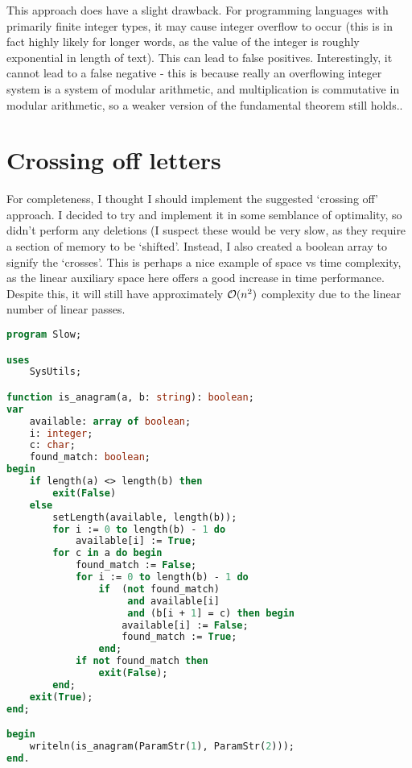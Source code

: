 \documentclass[fleqn,a4paper,11pt]{article}
\begin{document}
    This approach does have a slight drawback. For programming languages with
    primarily finite integer types, it may cause integer overflow to occur (this
    is in fact highly likely for longer words, as the value of the integer is
    roughly exponential in length of text). This can lead to false positives.
    Interestingly, it cannot lead to a false negative - this is because really
    an overflowing integer system is a system of modular arithmetic, and
    multiplication is commutative in modular arithmetic, so a weaker version of
    the fundamental theorem still holds..

    \section{Crossing off letters}

    For completeness, I thought I should implement the suggested `crossing off'
    approach. I decided to try and implement it in some semblance of optimality,
    so didn't perform any deletions (I suspect these would be very slow, as they
    require a section of memory to be `shifted'. Instead, I also created a
    boolean array to signify the `crosses'. This is perhaps a nice example of
    space vs time complexity, as the linear auxiliary space here offers a good
    increase in time performance. Despite this, it will still have approximately
    \(\operatorname{\mathcal O}(n^2)\) complexity due to the linear number of linear passes.

\begin{lstlisting}[language=Pascal, caption=`Crossing off' approach]
program Slow;

uses
    SysUtils;

function is_anagram(a, b: string): boolean;
var
    available: array of boolean;
    i: integer;
    c: char;
    found_match: boolean;
begin
    if length(a) <> length(b) then
        exit(False)
    else
        setLength(available, length(b));
        for i := 0 to length(b) - 1 do
            available[i] := True;
        for c in a do begin
            found_match := False;
            for i := 0 to length(b) - 1 do
                if  (not found_match)
                     and available[i]
                     and (b[i + 1] = c) then begin
                    available[i] := False;
                    found_match := True;
                end;
            if not found_match then
                exit(False);
        end;
    exit(True);
end;

begin
    writeln(is_anagram(ParamStr(1), ParamStr(2)));
end.
\end{lstlisting}
\end{document}
